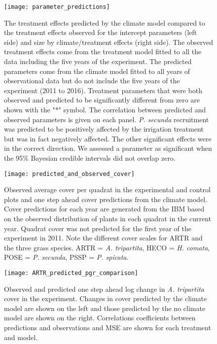 \documentclass[11pt]{article}
\begin{document}
\begin{figure}[!htbp]
	\centering
	\texttt{[image: parameter\_predictions]}
	\caption{The treatment effects predicted by the climate model compared to the treatment effects observed for the intercept parameters (left side) and size by climate/treatment effects (right side).  The observed treatment effects come from the treatment model fitted to all the data including the five years of the experiment.  The predicted parameters come from the climate model fitted to all years of observational data but do not include the five years of the experiment (2011 to 2016).  Treatment parameters that were both observed and predicted to be significantly different from zero are shown with the "*" symbol. The correlation between predicted and observed parameters is given on each panel. \textit{P. secunda} recruitment was predicted to be positively affected by the irrigation treatment but was in fact negatively affected. The other significant effects were in the correct direction. We assessed a parameter as significant when the 95\% Bayesian credible intervals did not overlap zero.}
	\label{fig:parPredictions}
\end{figure}

\begin{figure}[!htbp]
	\centering
	\texttt{[image: predicted\_and\_observed\_cover]}
	\caption{Observed average cover per quadrat in the experimental and control plots and one step ahead cover predictions from the climate model. Cover predictions for each year are generated from the IBM based on the observed distribution of plants in each quadrat in the current year. Quadrat cover was not predicted for the first year of the experiment in 2011.  Note the different cover scales for ARTR and the three grass species. ARTR = \textit{A. tripartita}, HECO = \textit{H. comata}, POSE = \textit{P. secunda}, PSSP = \textit{P. spicata}.}
	\label{fig:coverPred}
\end{figure}


\begin{figure}[!htbp]
	\centering
	\texttt{[image: ARTR\_predicted\_pgr\_comparison]}
	\caption{Observed and predicted one step ahead log change in \textit{A. tripartita} cover in the experiment. Changes in cover predicted by the climate model are shown on the left and those predicted by the no climate model are shown on the right. Correlations coefficients between predictions and observations and MSE are shown for each treatment and model.}
	\label{fig:pgrART}
\end{figure}
\end{document}
